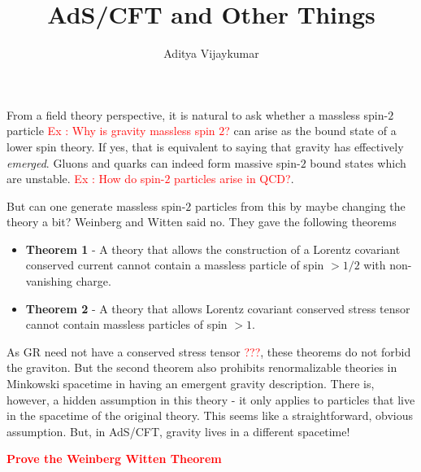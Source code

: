 \documentclass[a4paper,11pt]{article}
\title{\textbf{AdS/CFT and Other Things}}
\author{Aditya Vijaykumar}
\affiliation{International Centre for Theoretical Sciences, Bengaluru, India.}
\begin{document}
\maketitle

From a field theory perspective, it is natural to ask whether a massless spin-$2$ particle \textcolor{red}{Ex : Why is gravity massless spin $ 2 $?} can arise as the bound state of a lower spin theory. If yes, that is equivalent to saying that gravity has effectively \textit{emerged}. Gluons and quarks can indeed form massive spin-$ 2 $ bound states which are unstable. \textcolor{red}{Ex : How do spin-$2$ particles arise in QCD?}.

But can one generate massless spin-$ 2 $ particles from this by maybe changing the theory a bit? Weinberg and Witten said no. They gave the following theorems

\begin{itemize}

\item \textbf{Theorem 1} - A theory that allows the construction of a Lorentz covariant conserved current cannot contain a massless particle of spin $  > 1/2 $ with non-vanishing charge.
\item \textbf{Theorem 2} - A theory that allows Lorentz covariant conserved stress tensor cannot contain massless particles of spin $ >1 $.
\end{itemize}
As GR need not have a conserved stress tensor \textcolor{red}{???}, these theorems do not forbid the graviton. But the second theorem also prohibits renormalizable theories in Minkowski spacetime in having an emergent gravity description. There is, however, a hidden assumption in this theory - it only applies to particles that live in the spacetime of the original theory. This seems like a straightforward, obvious assumption. But, in AdS/CFT, gravity lives in a different spacetime!

\textbf{\textcolor{red}{{Prove the Weinberg Witten Theorem}}}
\end{document}
